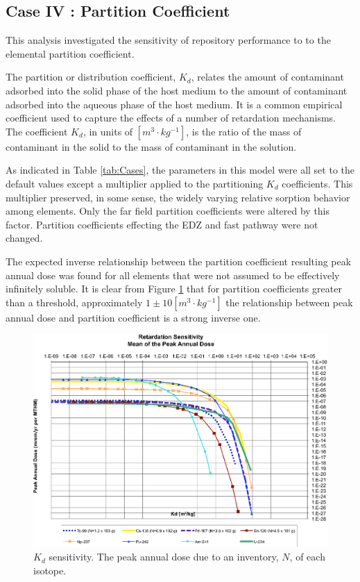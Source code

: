 
\subsection{Case IV : Partition Coefficient}

This analysis investigated the sensitivity of repository performance to
to the elemental partition coefficient. 

The partition or distribution coefficient, $K_d$, relates the amount of contaminant adsorbed into the 
solid phase of the host medium to the amount of contaminant adsorbed into the 
aqueous phase of the host medium. It is a common empirical coefficient used to 
capture the effects of a number of retardation mechanisms. The coefficient 
$K_d$, in units of $[m^3\cdot kg^{-1}]$, is the ratio of the mass of contaminant in the 
solid to the mass of contaminant in the solution.

As indicated in Table \ref{tab:Cases}, the parameters in this model were all set 
to the default values except a multiplier applied to the partitioning $K_d$ 
coefficients. This multiplier preserved, in some sense, the widely varying 
relative sorption behavior among elements. Only the far field partition 
coefficients were altered by this factor. Partition coefficients effecting the 
EDZ and fast pathway were not changed.

The expected inverse relationship between the partition coefficient resulting 
peak annual dose was found for all elements that were not assumed to be 
effectively infinitely soluble.  It is clear from Figure \ref{fig:KdSum} that 
for partition coefficients greater than a threshold, approximately 
  $1\pm10[m^3\cdot kg^{-1}]$ the relationship between 
peak annual dose and partition coefficient is a strong inverse one. 

\begin{figure}[ht]
  \centering
  \includegraphics[width=\linewidth]{Partitioning_Summary.eps}
  \caption{$K_d$ sensitivity.  The peak annual dose due to an inventory, 
  $N$, of each isotope.}
  \label{fig:KdSum}
\end{figure}

